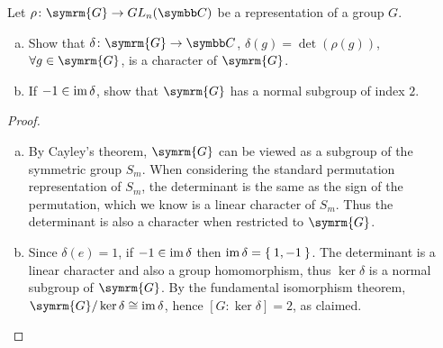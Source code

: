 \begin{exercise}
Let \(\rho \colon \symrm{G} \to GL_n(\complex)\) be a representation of a group \(G\).
\begin{enumerate}[(a)]
    \item Show that \(\delta \colon \symrm{G} \to \complex\), \(\delta(g) = \det(\rho(g))\), \(\forall g \in \symrm{G}\), is a character of \(\symrm{G}\).
    \item If \(-1 \in \operatorname*{im} \delta\), show that \(\symrm{G}\) has a normal subgroup of index \(2\).
\end{enumerate}
\end{exercise}
\begin{proof}
~
\begin{enumerate}[(a)]
    \item By Cayley's theorem, \(\symrm{G}\) can be viewed as a subgroup of the symmetric group \(S_m\). When considering the standard permutation representation of \(S_m\), the determinant is the same as the sign of the permutation, which we know is a linear character of \(S_m\). Thus the determinant is also a character when restricted to \(\symrm{G}\).
    
    \item Since \(\delta(e) = 1\), if \(-1 \in \operatorname*{im} \delta \) then \(\operatorname*{im} \delta = \Set{1, -1}\). The determinant is a linear character and also a group homomorphism, thus \(\ker \delta\) is a normal subgroup of \(\symrm{G}\). By the fundamental isomorphism theorem, \(\symrm{G} / \ker \delta \cong \ima \delta\), hence \([G : \ker \delta] = 2\), as claimed.
\end{enumerate}
\end{proof}